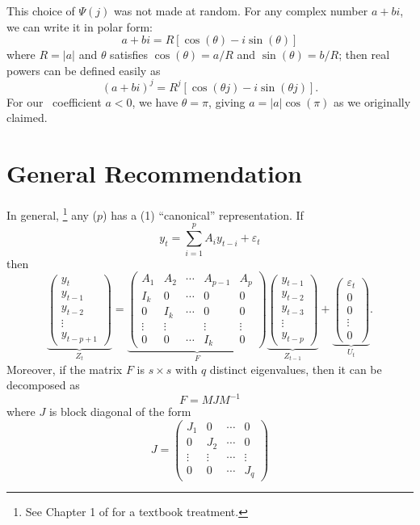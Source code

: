 \documentclass[12pt,fleqn]{article}
\newcommand{\vep}{\varepsilon}
\newcommand{\AR}{\allcaps{AR}}
\begin{document}
This choice of $\Psi(j)$ was not made at random. For any complex
number $a + bi$, we can write it in polar form:
\[
a + bi = R [\cos(\theta) - i \sin(\theta)]
\]
where $R = |a|$ and $\theta$ satisfies $\cos(\theta) = a/R$ and
$\sin(\theta) = b/R$; then real powers can be defined easily as
\[
(a + bi)^j = R^j [\cos(\theta j) - i \sin(\theta j)].
\]
For our \AR\ coefficient $a < 0$, we have $\theta = \pi$, giving
$a = |a| \cos(\pi)$ as we originally claimed.

\section{General Recommendation}\label{recommended}

In general,%
\footnote{See Chapter 1 of \citet{Ham:94} for a textbook treatment.} %
any \VAR($p$) has a \VAR(1) ``canonical'' representation. If
\[
y_t = \sum_{i=1}^p A_i y_{t-i} + \vep_t
\]
then
\[
\underbrace{\begin{pmatrix}
  y_t \\ y_{t-1} \\ y_{t-2} \\ \vdots \\ y_{t-p+1}
\end{pmatrix}}_{Z_t}
=
\underbrace{\begin{pmatrix}
  A_1 & A_2 & \cdots & A_{p-1} & A_p \\
  I_k & 0   & \cdots & 0 & 0 \\
  0  & I_k  & \cdots & 0 & 0 \\
  \vdots & \vdots & & \vdots & \vdots \\
  0 & 0 & \cdots & I_k & 0 
\end{pmatrix}}_{F}
\underbrace{\begin{pmatrix}
  y_{t-1} \\ y_{t-2} \\ y_{t-3} \\ \vdots \\ y_{t-p}
\end{pmatrix}}_{Z_{t-1}}
+
\underbrace{\begin{pmatrix}
  \vep_{t} \\ 0 \\ 0 \\ \vdots \\ 0
\end{pmatrix}}_{U_t}.
\]
Moreover, if the matrix $F$ is $s \times s$ with $q$ distinct
eigenvalues, then it can be decomposed as
\[
F = M J M^{-1}
\]
where $J$ is block diagonal of the form
\[
J = \begin{pmatrix}
  J_1 & 0 & \cdots & 0 \\
  0 & J_2 & \cdots & 0 \\
  \vdots & \vdots & \cdots & \vdots \\
  0 & 0 & \cdots & J_q
\end{pmatrix}
\]
\end{document}
